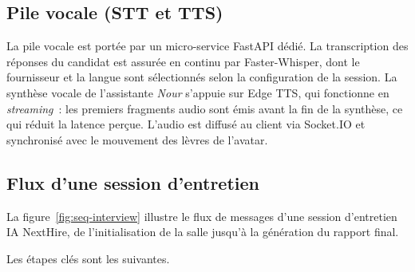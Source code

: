 \subsection{Pile vocale (STT et TTS)}

La pile vocale est portée par un micro-service FastAPI dédié. La transcription des réponses du candidat est assurée en continu par Faster-Whisper, dont le fournisseur et la langue sont sélectionnés selon la configuration de la session. La synthèse vocale de l'assistante \textit{Nour} s'appuie sur Edge TTS, qui fonctionne en \textit{streaming}~: les premiers fragments audio sont émis avant la fin de la synthèse, ce qui réduit la latence perçue. L'audio est diffusé au client via Socket.IO et synchronisé avec le mouvement des lèvres de l'avatar.

\subsection{Flux d'une session d'entretien}

La figure~\ref{fig:seq-interview} illustre le flux de messages d'une session d'entretien IA NextHire, de l'initialisation de la salle jusqu'à la génération du rapport final.

Les étapes clés sont les suivantes.

